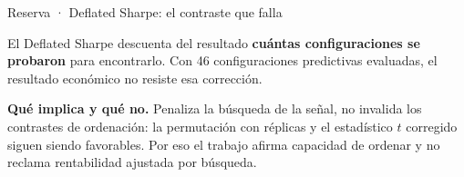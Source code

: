 \documentclass[aspectratio=169,11pt]{beamer}
\begin{document}
{%
\begin{frame}{Reserva · Deflated Sharpe: el contraste que falla}
  \vspace{0.40cm}
  \begin{center}
  \end{center}
  \vspace{0.35cm}
  {\footnotesize\hspace*{0.1cm}El Deflated Sharpe descuenta del resultado \textbf{cuántas
  configuraciones se probaron} para encontrarlo. Con 46 configuraciones predictivas evaluadas, el
  resultado económico no resiste esa corrección.}
  \par\medskip
  {\footnotesize\hspace*{0.1cm}\textbf{Qué implica y qué no.} Penaliza la búsqueda de la señal, no
  invalida los contrastes de ordenación: la permutación con \NumPermutaciones{} réplicas y el
  estadístico $t$ corregido siguen siendo favorables. Por eso el trabajo afirma capacidad de ordenar
  y no reclama rentabilidad ajustada por búsqueda.}
\end{frame}

}
\end{document}

